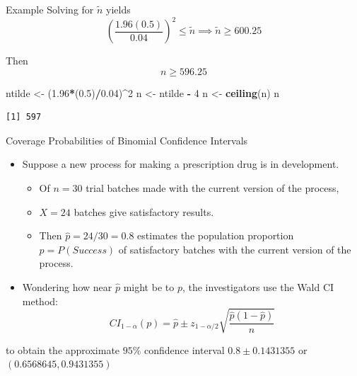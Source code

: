\documentclass[
  ignorenonframetext,
]{beamer}
\newenvironment{Shaded}{\begin{snugshade}}{\end{snugshade}}
\newcommand{\DecValTok}[1]{\textcolor[rgb]{0.00,0.00,0.81}{#1}}
\newcommand{\FloatTok}[1]{\textcolor[rgb]{0.00,0.00,0.81}{#1}}
\newcommand{\FunctionTok}[1]{\textcolor[rgb]{0.13,0.29,0.53}{\textbf{#1}}}
\newcommand{\NormalTok}[1]{#1}
\newcommand{\OtherTok}[1]{\textcolor[rgb]{0.56,0.35,0.01}{#1}}
\newcommand{\SpecialCharTok}[1]{\textcolor[rgb]{0.81,0.36,0.00}{\textbf{#1}}}
\providecommand{\tightlist}{%
  \setlength{\itemsep}{0pt}\setlength{\parskip}{0pt}}
\begin{document}
\begin{frame}[fragile]{Example}
\protect\hypertarget{example-4}{}
Solving for \(\tilde{n}\) yields
\[\left(\frac{1.96(0.5)}{0.04}\right)^2\leq \tilde{n} \implies \tilde{n}\geq 600.25\]

Then \[n\geq 596.25\] \tiny

\begin{Shaded}
\begin{Highlighting}[]
\NormalTok{ntilde }\OtherTok{\textless{}{-}}\NormalTok{ (}\FloatTok{1.96}\SpecialCharTok{*}\NormalTok{(}\FloatTok{0.5}\NormalTok{)}\SpecialCharTok{/}\FloatTok{0.04}\NormalTok{)}\SpecialCharTok{\^{}}\DecValTok{2}
\NormalTok{n }\OtherTok{\textless{}{-}}\NormalTok{ ntilde }\SpecialCharTok{{-}} \DecValTok{4}
\NormalTok{n }\OtherTok{\textless{}{-}} \FunctionTok{ceiling}\NormalTok{(n)}
\NormalTok{n}
\end{Highlighting}
\end{Shaded}

\begin{verbatim}
[1] 597
\end{verbatim}

\normalsize
\end{frame}

\begin{frame}{Coverage Probabilities of Binomial Confidence Intervals}
\protect\hypertarget{coverage-probabilities-of-binomial-confidence-intervals}{}
\begin{itemize}
\item
  Suppose a new process for making a prescription drug is in
  development.

  \begin{itemize}
  \tightlist
  \item
    Of \(n=30\) trial batches made with the current version of the
    process,
  \item
    \(X=24\) batches give satisfactory results.
  \item
    Then \(\hat{p}=24/30=0.8\) estimates the population proportion
    \(p=P(Success)\) of satisfactory batches with the current version of
    the process.
  \end{itemize}
\item
  Wondering how near \(\hat{p}\) might be to \(p\), the investigators
  use the Wald CI method:
  \[CI_{1 - \alpha}(p) =\hat{p}\pm z_{1-\alpha/2}\sqrt{\frac{\hat{p}(1-\hat{p})}{n}}\]
\end{itemize}

to obtain the approximate \(95\%\) confidence interval
\(0.8 \pm 0.1431355\) or \((0.6568645, 0.9431355)\)
\end{frame}
\end{document}
